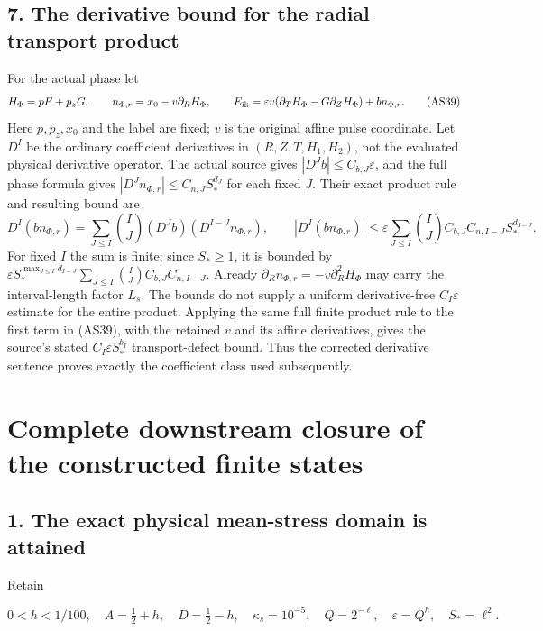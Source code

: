 \documentclass[10pt,a4paper]{article}
\begin{document}
\subsection{7. The derivative bound for the radial transport product}\label{gclosure:the-derivative-bound-for-the-radial-transport-product}

For the actual phase let \[
H_\Phi=pF+p_zG,\qquad n_{\Phi,r}=x_0-v\partial_RH_\Phi,
\qquad
E_{\rm ik}=\varepsilon v(\partial_TH_\Phi-G\partial_ZH_\Phi)+bn_{\Phi,r}.
\tag{AS39}
\] Here \(p,p_z,x_0\) and the label are fixed; \(v\) is the original affine pulse coordinate. Let \(D^I\) be the ordinary coefficient derivatives in \((R,Z,T,H_1,H_2)\), not the evaluated physical derivative operator. The actual source gives \(|D^Jb|\le C_{b,J}\varepsilon\), and the full phase formula gives \(|D^Jn_{\Phi,r}|\le C_{n,J}S_*^{d_J}\) for each fixed \(J\). Their exact product rule and resulting bound are \[
D^I(bn_{\Phi,r})=
\sum_{J\le I}\binom IJ(D^Jb)(D^{I-J}n_{\Phi,r}),
\qquad
|D^I(bn_{\Phi,r})|
\le\varepsilon\sum_{J\le I}\binom IJ C_{b,J}C_{n,I-J}S_*^{d_{I-J}}.
\tag{AS40}
\] For fixed \(I\) the sum is finite; since \(S_*\ge1\), it is bounded by \(\varepsilon S_*^{\max_{J\le I}d_{I-J}}\sum_{J\le I}\binom IJ C_{b,J}C_{n,I-J}\). Already \(\partial_Rn_{\Phi,r}=-v\partial_R^2H_\Phi\) may carry the interval-length factor \(L_s\). The bounds do not supply a uniform derivative-free \(C_I\varepsilon\) estimate for the entire product. Applying the same full finite product rule to the first term in (AS39), with the retained \(v\) and its affine derivatives, gives the source's stated \(C_I\varepsilon S_*^{b_I}\) transport-defect bound. Thus the corrected derivative sentence proves exactly the coefficient class used subsequently.

\section{Complete downstream closure of the constructed finite states}\label{gclosure:complete-downstream-closure-of-the-constructed-finite-states}

\subsection{1. The exact physical mean-stress domain is attained}\label{gclosure:the-exact-physical-mean-stress-domain-is-attained}

Retain

\[
0<h<1/100,\quad A=\tfrac12+h,\quad D=\tfrac12-h,
\quad \kappa_s=10^{-5},\quad Q=2^{-\ell},\quad
\varepsilon=Q^h,\quad S_*=\ell^2.
\]
\end{document}
